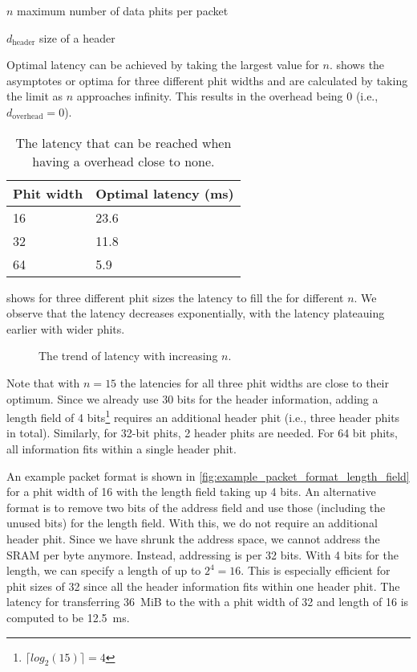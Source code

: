 
\begin{eqexpl}[15mm]
    \item{$n$} maximum number of data phits per packet
    \item{$d_{\text{header}}$} size of a header
\end{eqexpl}

Optimal latency can be achieved by taking the largest value for $n$.
 shows the asymptotes or optima for three different phit widths and are calculated by taking the limit as $n$ approaches infinity.
This results in the overhead being $0$ (i.e., $d_{\text{overhead}} = 0$).

\begin{table}[hbtp]
\centering
\begin{tabular}{@{}ll@{}}
\toprule
\textbf{Phit width} & \textbf{Optimal latency (ms)} \\ \midrule
16        & 23.6                  \\
32        & 11.8                  \\
64        & 5.9                   \\ \bottomrule
\end{tabular}
\caption{The latency that can be reached when having a overhead close to none.}
\label{tab:length_field_optimal_latency}
\end{table}

 shows for three different phit sizes the latency to fill the \graicore{} for different $n$.
We observe that the latency decreases exponentially, with the latency plateauing earlier with wider phits.

\begin{figure}[hbtp]
    \centering
    
    \caption{The trend of latency with increasing $n$.}
    \label{fig:n_vs_latency}
\end{figure}

Note that with $n=15$ the latencies for all three phit widths are close to their optimum.
Since we already use 30 bits for the header information, adding a length field of 4 bits\footnote{$\lceil log_{2}( 15 )\rceil = 4$} requires an additional header phit (i.e., three header phits in total). Similarly, for 32-bit phits, 2 header phits are needed. For 64 bit phits, all information fits within a single header phit.

An example packet format is shown in \cref{fig:example_packet_format_length_field} for a phit width of 16 with the length field taking up 4 bits.
An alternative format is to remove two bits of the address field and use those (including the unused bits) for the length field.
With this, we do not require an additional header phit.
Since we have shrunk the address space, we cannot address the SRAM per byte anymore.
Instead, addressing is per 32 bits.
With 4 bits for the length, we can specify a length of up to $2^4 = 16$.
This is especially efficient for phit sizes of 32 since all the header information fits within one header phit.
The latency for transferring \SI{36}{MiB} to the \graicore{} with a phit width of 32 and length of 16 is computed to be \SI{12.5}{ms}.

